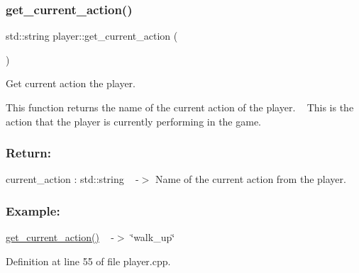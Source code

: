\subsubsection{\texorpdfstring{get\+\_\+current\+\_\+action()}{get\_current\_action()}}
{\footnotesize\ttfamily std\+::string player\+::get\+\_\+current\+\_\+action (\begin{DoxyParamCaption}{ }\end{DoxyParamCaption})}



Get current action the player. 

This function returns the name of the current action of the player. ~\newline
This is the action that the player is currently performing in the game.~\newline


\subsubsection*{Return\+: }

current\+\_\+action \+: std\+::string ~\newline
-\/$>$ Name of the current action from the player.

\subsubsection*{Example\+: }

\hyperlink{classplayer_afc7732284851b7f0d90b66a5d25931e2}{get\+\_\+current\+\_\+action()} ~\newline
-\/$>$ \char`\"{}walk\+\_\+up\char`\"{} 

Definition at line 55 of file player.\+cpp.

